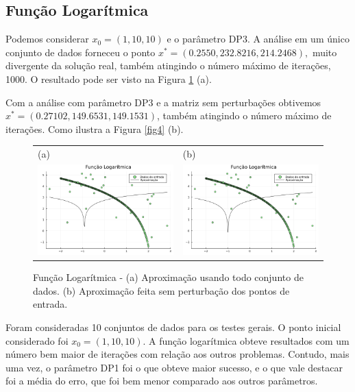 \documentclass[12pt,a4paper]{article}
\begin{document}
	\subsection{Função Logarítmica} \label{log}
		Podemos considerar $x_0=(1, 10, 10)$ e o parâmetro DP3. A análise em um único conjunto de dados
		forneceu o ponto $x^*=(0.2550, 232.8216, 214.2468),$  muito divergente da solução real, também atingindo o número
		máximo de iterações, 1000. O resultado pode ser visto na Figura \ref{fig3} (a).
	    
	   Com a análise com parâmetro DP3 e a matriz sem perturbações obtivemos
	   $x^* = (0.27102, 149.6531, 149.1531)$, também atingindo o número máximo
	   de iterações. Como ilustra a Figura \ref{fig4} (b).
	
	\begin{figure}[H]
		\centering 
		\begin{tabular}{ll}
			
			(a)& (b)   \\
			
			\includegraphics[width=0.45\linewidth]{5.png} & \includegraphics[width=0.45\linewidth]{6.png}\\ 
			
		\end{tabular}
		\caption{Função Logarítmica - (a) Aproximação usando todo conjunto de dados. (b) Aproximação feita sem perturbação dos pontos de entrada.}
		\label{fig3}
	\end{figure}
	
	
	Foram consideradas 10 conjuntos de dados para os testes gerais. O ponto inicial considerado foi $x_0 = (1, 10, 10).$ A função logarítmica obteve resultados com um número bem maior de iterações com relação aos outros problemas. Contudo, mais uma vez, o parâmetro DP1 foi o que obteve maior sucesso, e o que vale destacar foi a média do erro, que foi bem menor comparado aos outros parâmetros.
	
\end{document}
